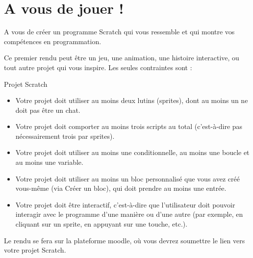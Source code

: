 \section{A vous de jouer !}
A vous de créer un programme Scratch qui vous ressemble et qui montre vos compétences en programmation.

Ce premier rendu peut être un jeu, une animation, une histoire interactive, ou tout autre projet qui vous inspire. Les seules contraintes sont : 
\begin{UPSTIaRendre}{Projet Scratch}    
    \begin{itemize}[label=$\square$]
    \item Votre projet doit utiliser au moins deux lutins (sprites), dont au moins un ne doit pas être un chat.
    \item Votre projet doit comporter au moins trois scripts au total (c'est-à-dire pas nécessairement trois par sprites).
    \item Votre projet doit utiliser au moins une conditionnelle, au moins une boucle et au moins une variable.
    \item Votre projet doit utiliser au moins un bloc personnalisé que vous avez créé vous-même (via Créer un bloc), qui doit prendre au moins une entrée.
    \item Votre projet doit être interactif, c'est-à-dire que l'utilisateur doit pouvoir interagir avec le programme d'une manière ou d'une autre (par exemple, en cliquant sur un sprite, en appuyant sur une touche, etc.).
    \end{itemize}
\end{UPSTIaRendre}

Le rendu se fera sur la plateforme moodle, où vous devrez soumettre le lien vers votre projet Scratch.  

 


